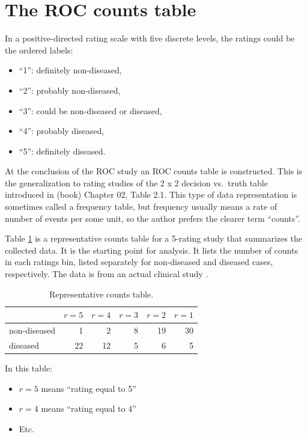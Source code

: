\documentclass[
]{book}
\providecommand{\tightlist}{%
  \setlength{\itemsep}{0pt}\setlength{\parskip}{0pt}}
\begin{document}
\hypertarget{the-roc-counts-table}{%
\section{The ROC counts table}\label{the-roc-counts-table}}

In a positive-directed rating scale with five discrete levels, the ratings could be the ordered labels:

\begin{itemize}
\tightlist
\item
  ``1'': definitely non-diseased,
\item
  ``2'': probably non-diseased,
\item
  ``3'': could be non-diseased or diseased,
\item
  ``4'': probably diseased,
\item
  ``5'': definitely diseased.
\end{itemize}

At the conclusion of the ROC study an ROC counts table is constructed. This is the generalization to rating studies of the 2 x 2 decision vs.~truth table introduced in (book) Chapter 02, Table 2.1. This type of data representation is sometimes called a frequency table, but frequency usually means a rate of number of events per some unit, so the author prefers the clearer term ``counts''.

Table \ref{tab:ratingsParadigmTable1} is a representative counts table for a 5-rating study that summarizes the collected data. It is the starting point for analysis. It lists the number of counts in each ratings bin, listed separately for non-diseased and diseased cases, respectively. The data is from an actual clinical study \citep{RN4343}.

\begin{table}

\caption{\label{tab:ratingsParadigmTable1}Representative counts table.}
\centering
\begin{tabular}[t]{l|r|r|r|r|r}
\hline
  & $r = 5$ & $r = 4$ & $r = 3$ & $r = 2$ & $r = 1$\\
\hline
non-diseased & 1 & 2 & 8 & 19 & 30\\
\hline
diseased & 22 & 12 & 5 & 6 & 5\\
\hline
\end{tabular}
\end{table}

In this table:

\begin{itemize}
\tightlist
\item
  \(r = 5\) means ``rating equal to 5''
\item
  \(r = 4\) means ``rating equal to 4''
\item
  Etc.
\end{itemize}
\end{document}
